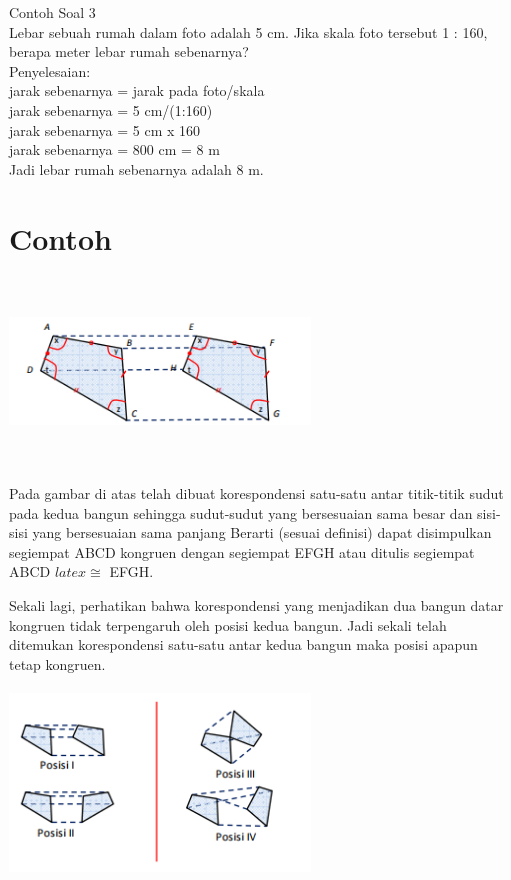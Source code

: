 \documentclass[11pt,fleqn]{book} %
\begin{document}
Contoh Soal 3\\
Lebar sebuah rumah dalam foto adalah 5 cm. Jika skala foto tersebut 1 : 160, berapa meter lebar rumah sebenarnya?\\

Penyelesaian:\\
jarak sebenarnya = jarak pada foto/skala\\
jarak sebenarnya = 5 cm/(1:160)\\
jarak sebenarnya = 5 cm x 160\\
jarak sebenarnya = 800 cm = 8 m\\
Jadi lebar rumah sebenarnya adalah 8 m.\\


\section{Contoh}
\includegraphics[width = 8cm, height= 5cm]{Pictures/1.png}
 
Pada gambar di atas telah dibuat korespondensi satu-satu antar titik-titik sudut pada kedua bangun sehingga sudut-sudut yang bersesuaian sama besar dan sisi-sisi yang bersesuaian sama panjang Berarti (sesuai definisi) dapat disimpulkan segiempat
ABCD kongruen dengan segiempat EFGH atau ditulis segiempat ABCD $latex\cong $ EFGH.

Sekali lagi, perhatikan bahwa korespondensi yang menjadikan dua bangun datar kongruen tidak terpengaruh oleh posisi kedua bangun. Jadi sekali telah ditemukan korespondensi satu-satu antar kedua bangun maka posisi apapun tetap kongruen. 

\includegraphics[width = 8cm, height= 5cm]{Pictures/2.png}
\end{document}
